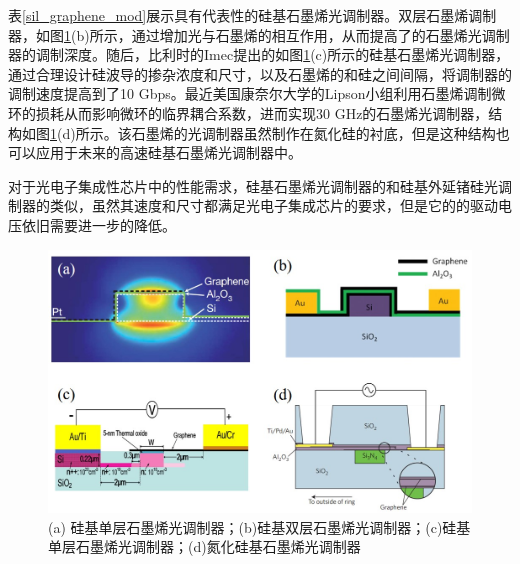 表\ref{sil_graphene_mod}展示具有代表性的硅基石墨烯光调制器。双层石墨烯调制器，如图\ref{sil_graphene_mod_str}(b)所示，通过增加光与石墨烯的相互作用，从而提高了的石墨烯光调制器的调制深度。随后，比利时的Imec提出的如图\ref{sil_graphene_mod_str}(c)所示的硅基石墨烯光调制器，通过合理设计硅波导的掺杂浓度和尺寸，以及石墨烯的和硅之间间隔，将调制器的调制速度提高到了10 Gbps\cite{liu2011graphene, hu2016broadband}。最近美国康奈尔大学的Lipson小组利用石墨烯调制微环的损耗从而影响微环的临界耦合系数，进而实现30 GHz的石墨烯光调制器，结构如图\ref{sil_graphene_mod_str}(d)所示。该石墨烯的光调制器虽然制作在氮化硅的衬底，但是这种结构也可以应用于未来的高速硅基石墨烯光调制器中。

对于光电子集成性芯片中的性能需求，硅基石墨烯光调制器的和硅基外延锗硅光调制器的类似，虽然其速度和尺寸都满足光电子集成芯片的要求，但是它的的驱动电压依旧需要进一步的降低。

\begin{figure}[htb]
	\centering
	\includegraphics[width=12cm]{./Pictures/fig_graphene_mod.jpg}
	\caption{ (a) 硅基单层石墨烯光调制器\cite{liu2011graphene}；(b)硅基双层石墨烯光调制器\cite{liu2012double}；(c)硅基单层石墨烯光调制器\cite{hu2014broadband, hu2016broadband}；(d)氮化硅基石墨烯光调制器\cite{phare2015graphene}}
	\label{sil_graphene_mod_str}
\end{figure}


